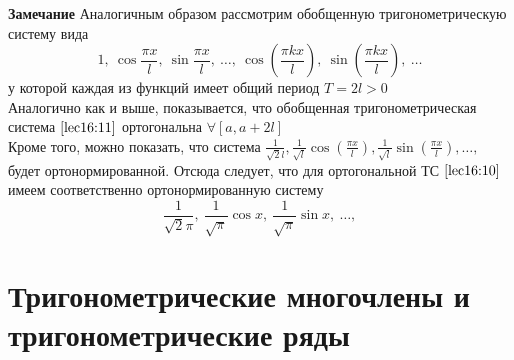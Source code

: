 \documentclass[../../main.tex]{subfiles}
\begin{document}
	\textbf{Замечание} Аналогичным образом рассмотрим обобщенную 
	тригонометрическую
	 систему вида 
	\begin{equation}
	\label{lec16:11}
	1, \ \cos \frac{\pi x}{l}, \ \sin \frac{\pi x}{l}, \ \ldots, \ \cos 
	(\frac{\pi kx}{l}), \
	 \sin (\frac{\pi kx}{l}), \ \ldots 
	\end{equation}
	у которой каждая из функций имеет общий период $T = 2l > 0$\\
	Аналогично как и выше, показывается, что обобщенная тригонометрическая 
	система
	 $\eqref{lec16:11}$ ортогональна $\forall [a, a+2l]$\\
	Кроме того, можно показать, что система $\frac{1}{\sqrt2l}, \frac{1}{\sqrt l}
	 \cos(\frac{\pi x}{l}), \frac{1}{\sqrt l} \sin (\frac{\pi x}{l}), \ldots, $ 
	 будет
	  ортонормированной. Отсюда следует, что для ортогональной ТС 
	  $\eqref{lec16:10}$
	   имеем соответственно ортонормированную систему 
	\begin{equation}
	\label{lec16:12}
	\frac{1}{\sqrt2\pi}, \ \frac{1}{\sqrt \pi} \cos x, \ \frac{1}{\sqrt \pi} \sin 
	
	x, \ \ldots,
	\end{equation}
	\section{Тригонометрические многочлены и тригонометрические ряды}
	
\end{document}
